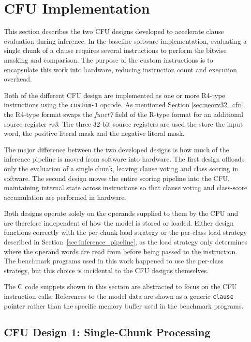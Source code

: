 \section{CFU Implementation}
\label{sec:cfu_impl}

This section describes the two CFU designs developed to accelerate clause
evaluation during inference. In the baseline software implementation, evaluating
a single chunk of a clause requires several instructions to perform the bitwise
masking and comparison. The purpose of the custom instructions is to encapsulate
this work into hardware, reducing instruction count and execution overhead.

Both of the different CFU design are implemented as one or more R4-type instructions using the \texttt{custom-1} opcode. As mentioned Section \ref{sec:neorv32_cfu}, the R4-type format swaps the \textit{funct7} field of the R-type format for an additional source register \textit{rs3}. The three 32-bit source registers are used the store the input word, the positive literal mask and the negative literal mask.

The major difference between the two developed designs is how much of the inference pipeline is moved from software into hardware. The first design offloads only the evaluation of a single chunk, leaving clause voting and class scoring in software. The second design moves the entire scoring pipeline into the CFU, maintaining internal state across instructions so that clause voting and class-score accumulation are performed in hardware.

Both designs operate solely on the operands supplied to them by the CPU and are therefore independent of how the model is stored or loaded. Either design functions correctly with the per-chunk load strategy or the per-class load strategy described in Section~\ref{sec:inference_pipeline}, as the load strategy only determines where the operand words are read from before being passed to the instruction. The benchmark programs used in this work happened to use the per-class strategy, but this choice is incidental to the CFU designs themselves.

The C code snippets shown in this section are abstracted to focus on the CFU instruction calls. References to the model data are shown as a generic \texttt{clause} pointer rather than the specific memory buffer used in the benchmark programs.

\subsection{CFU Design 1: Single-Chunk Processing}
\label{sec:cfu_design1}

